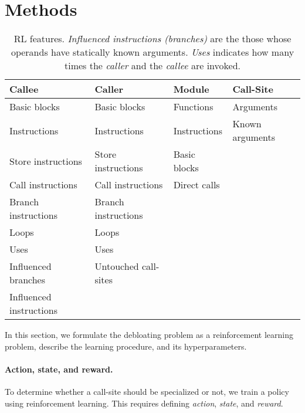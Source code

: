 \section{Methods}
\label{sec:methods}
\begin{table}[t]
  \centering
    \renewcommand{\arraystretch}{1.2}

    \begin{tabular}{@{}llll@{}}
      \toprule
      \textbf{Callee}& \textbf{Caller} & \textbf{Module} & \textbf{Call-Site}\\ \midrule
      Basic blocks & Basic blocks & Functions & Arguments \\
      Instructions & Instructions & Instructions & Known arguments\\
      Store instructions & Store instructions & Basic blocks &  \\
      Call instructions & Call instructions & Direct calls &  \\
      Branch instructions & Branch instructions &  &  \\
      Loops & Loops &  &  \\
      Uses & Uses &  &  \\
      Influenced branches & Untouched call-sites &  &  \\
      Influenced instructions &  &  &  \\ \bottomrule 

    \end{tabular}
  \caption{RL features. \emph{Influenced instructions
      (branches)} are the those  whose operands have statically known arguments. \emph{Uses} indicates how many times the
\emph{caller} and the \emph{callee} are invoked.}
  \label{tab:features}
\end{table}

In this section, we formulate the debloating problem as a reinforcement learning
problem, describe the learning procedure, and its hyperparameters.

\paragraph{Action, state, and reward.}
To determine whether a call-site should be specialized or not, we train a policy
using reinforcement learning. This requires defining \emph{action},
\emph{state}, and \emph{reward}.

